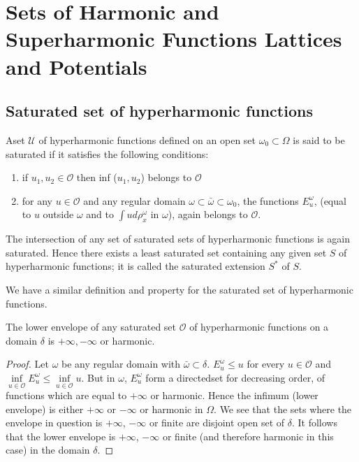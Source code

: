 \chapter[Sets of Harmonic and Superharmonic Functions...]{Sets of Harmonic and Superharmonic Functions Lattices and
  Potentials}\label{p4:chap4} 

\setcounter{section}{13}
\section{Saturated set of hyperharmonic functions}\label{p4:chap4:sec14}

\begin{defn}\label{p4:chap4:sec14:def11}%
  A\pageoriginale set $\mathscr{U}$ of hyperharmonic functions defined on an open
  set $\omega_0 \subset \Omega$ is said to be saturated if it
  satisfies the following conditions: 
  \begin{enumerate}[\rm (i)]
  \item if $u_1,  u_2 \in \mathscr{O}$ then inf ($u_1,  u_2$) belongs
    to $\mathscr{O}$ 
  \item for any $u \in \mathscr{O}$ and any regular domain $\omega
    \subset \bar{\omega} \subset \omega_0$, the functions
    $E^{\omega}_u$, (equal to $u$ outside $\omega$ and to $\int ud
    \rho^{\omega}_{x}$ in $\omega$), again belongs to $\mathscr{O}$. 
  \end{enumerate}
\end{defn}

The intersection of any set of saturated sets of hyperharmonic
functions is again saturated. Hence there exists a least saturated set
containing any given set $S$ of hyperharmonic functions; it is called
the saturated extension $S^*$ of $S$. 

We have a similar definition and property for the saturated set of
hyperharmonic functions. 

\begin{thm}\label{p4:chap4:sec14:thm8}%
  The lower envelope of any saturated set $\mathscr{O}$ of
  hyperharmonic functions on a domain $\delta$ is $+ \infty,  -
  \infty$ or harmonic. 
\end{thm} 

\begin{proof}
  Let $\omega$ be any regular domain with $\bar{\omega} \subset
  \delta$. $E^\omega_u \le u$ for every $u \in \mathscr{O}$ and $\inf
  \limits_{u \in \mathscr{O}} E^\omega_u \le \inf \limits_{u \in
    \mathscr{O}} u$. But in $\omega$, $E^\omega_u$ form a directed\pageoriginale set
  for decreasing order, of functions which are equal to $+ \infty$ or
  harmonic. Hence the infimum (lower envelope) is either $+ \infty$ or
  $- \infty$ or harmonic in $\Omega$. We see that the sets where the
  envelope in question is $+ \infty$, $- \infty$ or finite are
  disjoint open set of $\delta$. It follows that the lower envelope is
  $+ \infty$, $- \infty$ or finite (and therefore harmonic in this
  case) in the domain $\delta$. 
\end{proof} 
 
